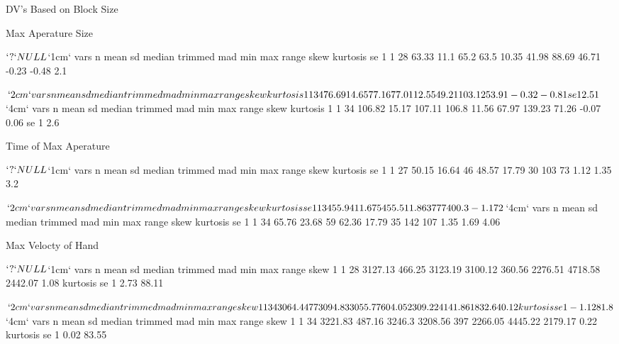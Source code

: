 \documentclass{article}
\begin{document}
\newpage

\normalsize
\bf
\centerline{DV's Based on Block Size}
\small
Max Aperature Size
\begin{Schunk}
\begin{Soutput}
$`?`
NULL

$`1cm`
  vars  n  mean   sd median trimmed   mad   min   max range  skew kurtosis  se
1    1 28 63.33 11.1   65.2    63.5 10.35 41.98 88.69 46.71 -0.23    -0.48 2.1

$`2cm`
  vars  n  mean    sd median trimmed   mad   min    max range  skew kurtosis
1    1 34 76.69 14.65  77.16   77.01 12.55 49.21 103.12 53.91 -0.32    -0.81
    se
1 2.51

$`4cm`
  vars  n   mean    sd median trimmed   mad   min    max range  skew kurtosis
1    1 34 106.82 15.17 107.11   106.8 11.56 67.97 139.23 71.26 -0.07     0.06
   se
1 2.6
\end{Soutput}
\end{Schunk}

Time of Max Aperature
\begin{Schunk}
\begin{Soutput}
$`?`
NULL

$`1cm`
  vars  n  mean    sd median trimmed   mad min max range skew kurtosis  se
1    1 27 50.15 16.64     46   48.57 17.79  30 103    73 1.12     1.35 3.2

$`2cm`
  vars  n  mean    sd median trimmed   mad min max range skew kurtosis se
1    1 34 55.94 11.67     54    55.5 11.86  37  77    40  0.3    -1.17  2

$`4cm`
  vars  n  mean    sd median trimmed   mad min max range skew kurtosis   se
1    1 34 65.76 23.68     59   62.36 17.79  35 142   107 1.35     1.69 4.06
\end{Soutput}
\end{Schunk}

Max Velocty of Hand
\begin{Schunk}
\begin{Soutput}
$`?`
NULL

$`1cm`
  vars  n    mean     sd  median trimmed    mad     min     max   range skew
1    1 28 3127.13 466.25 3123.19 3100.12 360.56 2276.51 4718.58 2442.07 1.08
  kurtosis    se
1     2.73 88.11

$`2cm`
  vars  n   mean  sd  median trimmed    mad     min     max   range skew
1    1 34 3064.4 477 3094.83 3055.77 604.05 2309.22 4141.86 1832.64 0.12
  kurtosis   se
1    -1.12 81.8

$`4cm`
  vars  n    mean     sd median trimmed mad     min     max   range skew
1    1 34 3221.83 487.16 3246.3 3208.56 397 2266.05 4445.22 2179.17 0.22
  kurtosis    se
1     0.02 83.55
\end{Soutput}
\end{Schunk}
\end{document}
